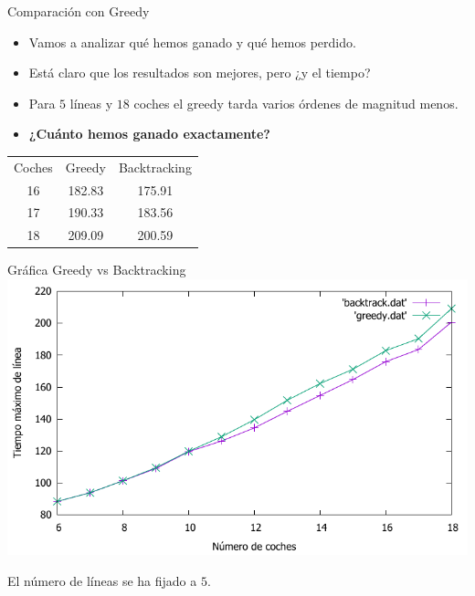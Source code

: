 \begin{frame}{Comparación con Greedy}
	\begin{itemize}
		\item Vamos a analizar qué hemos ganado y qué hemos perdido.
		\pause
		\item Está claro que los resultados son mejores, pero ¿y el tiempo?
		\pause
		\item Para $5$ líneas y $18$ coches el greedy tarda varios órdenes de magnitud menos.
		\item \textbf{¿Cuánto hemos ganado exactamente?}


	\end{itemize}
	\begin{center}
			\begin{tabular}{c|c|c}
				Coches	& Greedy  & Backtracking  \\
				16  & 182.83 & 175.91 \\
				17	& 190.33 & 183.56 \\
				18	& 209.09 & 200.59
			\end{tabular}

	\end{center}

\end{frame}

\begin{frame}{Gráfica Greedy vs Backtracking}
	\includegraphics[width = \linewidth]{./img/comp.pdf}

	El número de líneas se ha fijado a $5$.
\end{frame}
